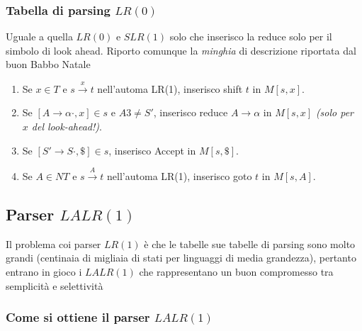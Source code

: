 \subsubsection{Tabella di parsing $LR(0)$}
Uguale a quella $LR(0)$ e $SLR(1)$ solo che inserisco la reduce solo per il simbolo di look ahead. Riporto comunque la \textit{minghia} di descrizione riportata dal buon Babbo Natale

\begin{enumerate}
    \item Se \( x \in T \) e \( s \xrightarrow{x} t \) nell'automa LR(1), inserisco shift \( t \) in \( M[s, x] \).
    \item Se \([A \to \alpha \cdot, x] \in s\) e \( A 3\neq S' \), inserisco reduce \( A \to \alpha \) in \( M[s, x] \) \textit{(solo per \( x \) del look-ahead!)}.
    \item Se \([S' \to S \cdot, \$] \in s\), inserisco Accept in \( M[s, \$] \).
    \item Se \( A \in NT \) e \( s \xrightarrow{A} t \) nell'automa LR(1), inserisco goto \( t \) in \( M[s, A] \).
\end{enumerate}


\subsection{Parser $LALR(1)$}

Il problema coi parser $LR(1)$ è che le tabelle sue tabelle di parsing sono molto grandi (centinaia di migliaia di stati per linguaggi di media grandezza), pertanto entrano in gioco i $LALR(1)$ che rappresentano un buon compromesso tra semplicità e selettività

\subsubsection{Come si ottiene il parser $LALR(1)$}


